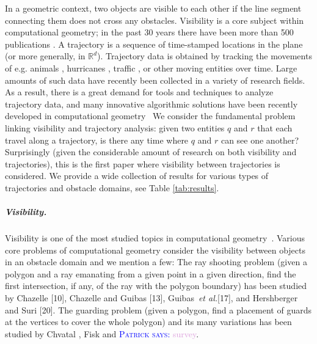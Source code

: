 \documentclass[a4paper, UKenglish]{paper}
\newcommand{\myremark}[4]{\textcolor{blue}{\textsc{#1 #2:}} \textcolor{#4}{\textsf{#3}}}
\newcommand{\patrick}[2][says]{\myremark{Patrick}{#1}{#2}{Plum}}
\newcommand{\etal}{\textit{et al.}\xspace}
\begin{document}
In a geometric context, two objects are visible to each other if the line segment connecting them does not cross any obstacles. Visibility is a core subject within computational geometry; in the past 30 years there have been more than 500 publications \cite{ORourke87}. A trajectory is a sequence of time-stamped locations in the plane (or more generally, in $\mathbb{R}^d$). Trajectory data is obtained by tracking the movements of e.g. animals \cite{BovetB88,Calenge200934,gal-nmibc-09}, hurricanes \cite{Stohl1998947}, traffic \cite{lltx-dftf-10}, or other moving entities \cite{dwf-rpm-09} over time.
Large amounts of such data have recently been collected in a variety of research fields. As a result, there is a great demand for tools and
techniques to analyze trajectory data, and many innovative algorithmic solutions have been recently developed in computational geometry~\cite{bbgll-dcpcs-11,grsc-pcecu-07,gs-tcmrm-99,lhw-tc-07,vgk-dsmt-02}
We consider the fundamental problem linking visibility and trajectory analysis: given two entities $q$ and $r$ that each travel along a trajectory, is there any time where $q$ and $r$ can see one another? Surprisingly (given the considerable amount of research on both visibility and trajectories), this is the first paper where visibility between trajectories is considered. We provide a wide collection of results for various types of trajectories and obstacle domains, see Table \ref{tab:results}.


\subparagraph{Visibility.}

Visibility is one of the most studied topics in computational geometry~\cite {moet,welzl1985constructing,POCCHIOLA1996279}. Various core problems of computational geometry consider the visibility between objects in an obstacle domain and we mention a few:
The ray shooting problem (given a polygon and a ray emanating from a given point in a given direction, find the first intersection, if any, of the ray with the polygon boundary) has been studied by Chazelle [10], Chazelle and Guibas [13], Guibas~\etal [17], and Hershberger and Suri [20]. The guarding problem (given a polygon, find a placement of guards at the vertices to cover the whole polygon) and its many variations has been studied by Chvatal \cite{Chvatal75}, Fisk \cite{Fisk78} and \patrick{survey}.
\end{document}
